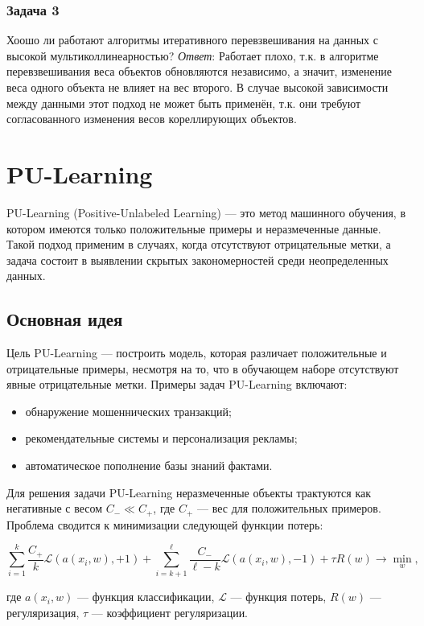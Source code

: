 \subsubsection{Задача 3}
Хоошо ли работают алгоритмы итеративного перевзвешивания на данных с высокой
мультиколлинеарностью?
\textit{Ответ}: Работает плохо, т.к. в алгоритме перевзвешивания веса объектов
обновляются независимо, а значит, изменение веса одного объекта не влияет на
вес второго. В случае высокой зависимости между данными этот подход не может
быть применён, т.к. они требуют согласованного изменения весов кореллирующих
объектов.

\section{PU-Learning}

PU-Learning (Positive-Unlabeled Learning) — это метод машинного обучения, в котором имеются только положительные примеры и неразмеченные данные. Такой подход применим в случаях, когда отсутствуют отрицательные метки, а задача состоит в выявлении скрытых закономерностей среди неопределенных данных.

\subsection{Основная идея}

Цель PU-Learning — построить модель, которая различает положительные и отрицательные примеры, несмотря на то, что в обучающем наборе отсутствуют явные отрицательные метки. Примеры задач PU-Learning включают:

\begin{itemize}
    \item обнаружение мошеннических транзакций;
    \item рекомендательные системы и персонализация рекламы;
    \item автоматическое пополнение базы знаний фактами.
\end{itemize}

Для решения задачи PU-Learning неразмеченные объекты трактуются как негативные с весом \( C_- \ll C_+ \), где \( C_+ \) — вес для положительных примеров. Проблема сводится к минимизации следующей функции потерь:

\[
\sum_{i=1}^k \frac{C_+}{k} \mathcal{L}(a(x_i, w), +1) + \sum_{i=k+1}^\ell \frac{C_-}{\ell - k} \mathcal{L}(a(x_i, w), -1) + \tau R(w) \to \min_w,
\]

где \( a(x_i, w) \) — функция классификации, \( \mathcal{L} \) — функция потерь, \( R(w) \) — регуляризация, \( \tau \) — коэффициент регуляризации.

